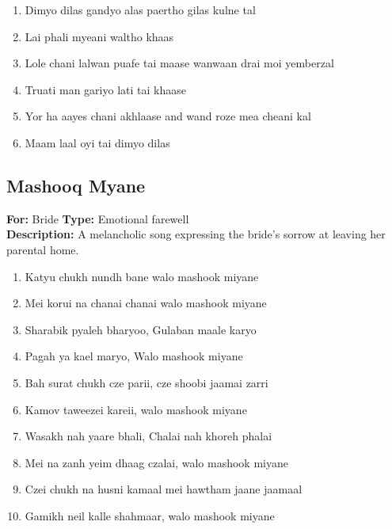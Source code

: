 \documentclass[12pt]{article}
\newcommand{\bigroman}[1]{\fontsize{16pt}{18pt}\selectfont\RaggedRight #1}
\begin{document}
\begin{multicols}{2}
\begin{enumerate}[leftmargin=*, label=\arabic*., font=\fontsize{16pt}{18pt}\selectfont]
  \item \bigroman{Dimyo dilas gandyo alas paertho gilas kulne tal}
  \item \bigroman{Lai phali myeani waltho khaas}
  \item \bigroman{Lole chani lalwan puafe tai maase wanwaan drai moi yemberzal}
  \item \bigroman{Truati man gariyo lati tai khaase}
  \item \bigroman{Yor ha aayes chani akhlaase and wand roze mea cheani kal}
  \item \bigroman{Maam laal oyi tai dimyo dilas}
\end{enumerate}

\subsection*{Mashooq Myane}
\textbf{For:} Bride \quad \textbf{Type:} Emotional farewell\\
\textbf{Description:} A melancholic song expressing the bride's sorrow at leaving her parental home.


\begin{multicols}{2}
\begin{enumerate}[leftmargin=*, label=\arabic*., font=\fontsize{16pt}{18pt}\selectfont]
  \item \bigroman{Katyu chukh nundh bane walo mashook miyane}
  \item \bigroman{Mei korui na chanai chanai walo mashook miyane}
  \item \bigroman{Sharabik pyaleh bharyoo, Gulaban maale karyo}
  \item \bigroman{Pagah ya kael maryo, Walo mashook miyane}
  \item \bigroman{Bah surat chukh cze parii, cze shoobi jaamai zarri}
  \item \bigroman{Kamov taweezei kareii, walo mashook miyane}
  \item \bigroman{Wasakh nah yaare bhali, Chalai nah khoreh phalai}
  \item \bigroman{Mei na zanh yeim dhaag czalai, walo mashook miyane}
  \item \bigroman{Czei chukh na husni kamaal mei hawtham jaane jaamaal}
  \item \bigroman{Gamikh neil kalle shahmaar, walo mashook miyane}
\end{enumerate}


\end{multicols}
\end{multicols}
\end{document}
